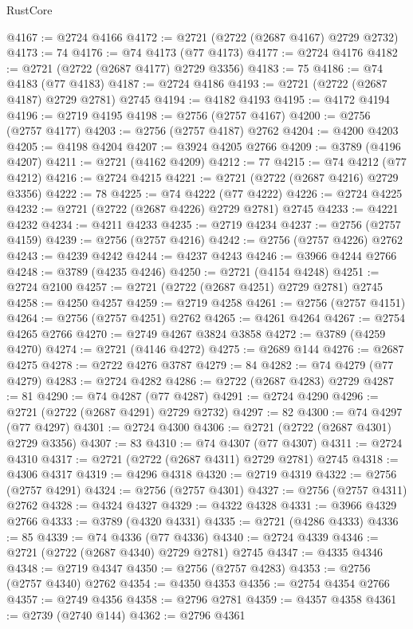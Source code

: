 \begin{lexlean}{RustCore}
\begin{coremodule}
@4167 := @2724 @4166
@4172 := @2721 (@2722 (@2687 @4167) @2729 @2732)
@4173 := 74
@4176 := @74 @4173 (@77 @4173)
@4177 := @2724 @4176
@4182 := @2721 (@2722 (@2687 @4177) @2729 @3356)
@4183 := 75
@4186 := @74 @4183 (@77 @4183)
@4187 := @2724 @4186
@4193 := @2721 (@2722 (@2687 @4187) @2729 @2781) @2745
@4194 := @4182 @4193
@4195 := @4172 @4194
@4196 := @2719 @4195
@4198 := @2756 (@2757 @4167)
@4200 := @2756 (@2757 @4177)
@4203 := @2756 (@2757 @4187) @2762
@4204 := @4200 @4203
@4205 := @4198 @4204
@4207 := @3924 @4205 @2766
@4209 := @3789 (@4196 @4207)
@4211 := @2721 (@4162 @4209)
@4212 := 77
@4215 := @74 @4212 (@77 @4212)
@4216 := @2724 @4215
@4221 := @2721 (@2722 (@2687 @4216) @2729 @3356)
@4222 := 78
@4225 := @74 @4222 (@77 @4222)
@4226 := @2724 @4225
@4232 := @2721 (@2722 (@2687 @4226) @2729 @2781) @2745
@4233 := @4221 @4232
@4234 := @4211 @4233
@4235 := @2719 @4234
@4237 := @2756 (@2757 @4159)
@4239 := @2756 (@2757 @4216)
@4242 := @2756 (@2757 @4226) @2762
@4243 := @4239 @4242
@4244 := @4237 @4243
@4246 := @3966 @4244 @2766
@4248 := @3789 (@4235 @4246)
@4250 := @2721 (@4154 @4248)
@4251 := @2724 @2100
@4257 := @2721 (@2722 (@2687 @4251) @2729 @2781) @2745
@4258 := @4250 @4257
@4259 := @2719 @4258
@4261 := @2756 (@2757 @4151)
@4264 := @2756 (@2757 @4251) @2762
@4265 := @4261 @4264
@4267 := @2754 @4265 @2766
@4270 := @2749 @4267 @3824 @3858
@4272 := @3789 (@4259 @4270)
@4274 := @2721 (@4146 @4272)
@4275 := @2689 @144
@4276 := @2687 @4275
@4278 := @2722 @4276 @3787
@4279 := 84
@4282 := @74 @4279 (@77 @4279)
@4283 := @2724 @4282
@4286 := @2722 (@2687 @4283) @2729
@4287 := 81
@4290 := @74 @4287 (@77 @4287)
@4291 := @2724 @4290
@4296 := @2721 (@2722 (@2687 @4291) @2729 @2732)
@4297 := 82
@4300 := @74 @4297 (@77 @4297)
@4301 := @2724 @4300
@4306 := @2721 (@2722 (@2687 @4301) @2729 @3356)
@4307 := 83
@4310 := @74 @4307 (@77 @4307)
@4311 := @2724 @4310
@4317 := @2721 (@2722 (@2687 @4311) @2729 @2781) @2745
@4318 := @4306 @4317
@4319 := @4296 @4318
@4320 := @2719 @4319
@4322 := @2756 (@2757 @4291)
@4324 := @2756 (@2757 @4301)
@4327 := @2756 (@2757 @4311) @2762
@4328 := @4324 @4327
@4329 := @4322 @4328
@4331 := @3966 @4329 @2766
@4333 := @3789 (@4320 @4331)
@4335 := @2721 (@4286 @4333)
@4336 := 85
@4339 := @74 @4336 (@77 @4336)
@4340 := @2724 @4339
@4346 := @2721 (@2722 (@2687 @4340) @2729 @2781) @2745
@4347 := @4335 @4346
@4348 := @2719 @4347
@4350 := @2756 (@2757 @4283)
@4353 := @2756 (@2757 @4340) @2762
@4354 := @4350 @4353
@4356 := @2754 @4354 @2766
@4357 := @2749 @4356
@4358 := @2796 @2781
@4359 := @4357 @4358
@4361 := @2739 (@2740 @144)
@4362 := @2796 @4361

\end{coremodule}
\end{lexlean}
